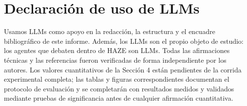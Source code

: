 \documentclass[10pt]{article}
\begin{document}
\section*{Declaración de uso de LLMs}

Usamos LLMs como apoyo en la redacción, la estructura y el encuadre bibliográfico de este
informe. Además, los LLMs son el propio objeto de estudio: los agentes que debaten dentro
de HAZE son LLMs. Todas las afirmaciones técnicas y las referencias fueron verificadas de
forma independiente por los autores. Los valores cuantitativos de la Sección 4 están
pendientes de la corrida experimental completa; las tablas y figuras correspondientes
documentan el protocolo de evaluación y se completarán con resultados medidos y validados
mediante pruebas de significancia antes de cualquier afirmación cuantitativa.
\end{document}
